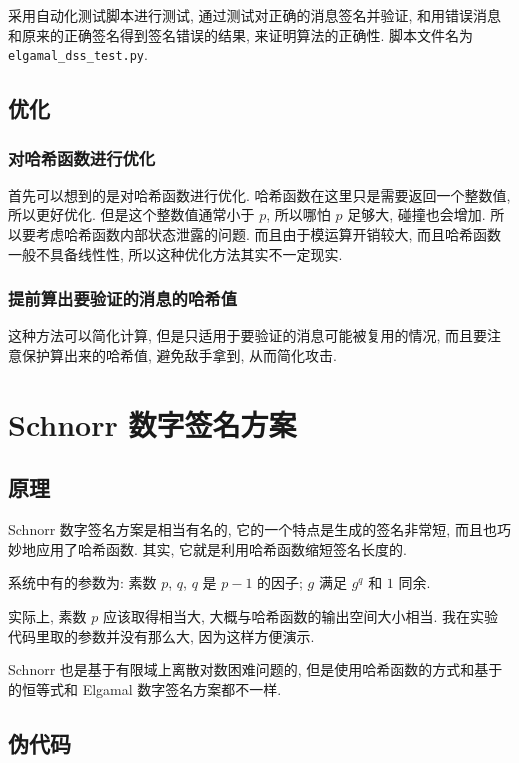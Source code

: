 \documentclass[12pt,a4paper]{article}
\begin{document}
采用自动化测试脚本进行测试, 通过测试对正确的消息签名并验证, 和用错误消息和原来的正确签名得到签名错误的结果, 来证明算法的正确性. 脚本文件名为 \verb|elgamal_dss_test.py|. 

\subsection*{优化}

\subsubsection*{对哈希函数进行优化}

首先可以想到的是对哈希函数进行优化. 哈希函数在这里只是需要返回一个整数值, 所以更好优化. 但是这个整数值通常小于 $ p $, 所以哪怕 $ p $ 足够大, 碰撞也会增加. 所以要考虑哈希函数内部状态泄露的问题. 而且由于模运算开销较大, 而且哈希函数一般不具备线性性, 所以这种优化方法其实不一定现实. 

\subsubsection*{提前算出要验证的消息的哈希值}

这种方法可以简化计算, 但是只适用于要验证的消息可能被复用的情况, 而且要注意保护算出来的哈希值, 避免敌手拿到, 从而简化攻击. 

\section*{Schnorr 数字签名方案}

\subsection*{原理}

Schnorr 数字签名方案是相当有名的, 它的一个特点是生成的签名非常短, 而且也巧妙地应用了哈希函数. 其实, 它就是利用哈希函数缩短签名长度的. 

系统中有的参数为: 素数 $ p $, $ q $, $ q $ 是 $ p - 1 $ 的因子; $ g $ 满足 $ g^q $ 和 $ 1 $ 同余. 

实际上, 素数 $ p $ 应该取得相当大, 大概与哈希函数的输出空间大小相当. 我在实验代码里取的参数并没有那么大, 因为这样方便演示. 

Schnorr 也是基于有限域上离散对数困难问题的, 但是使用哈希函数的方式和基于的恒等式和 Elgamal 数字签名方案都不一样. 

\subsection*{伪代码}
\end{document}
